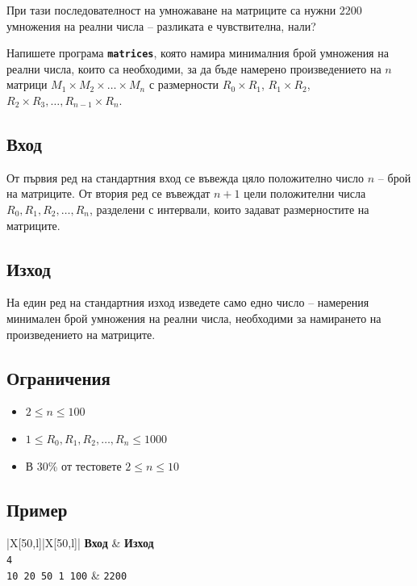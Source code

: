 \documentclass[12pt]{article}
\begin{document}
При тази последователност на умножаване на матриците са нужни $2200$ умножения на реални числа -- разликата е чувствителна, нали?

Напишете програма \textbf{\texttt{matrices}}, която намира минималния брой умножения на реални числа, които са необходими, за да бъде намерено произведението на $n$ матрици $M_1 \times M_2 \times \ldots \times M_n$ с размерности $R_0 \times R_1$, $R_1 \times R_2$, $R_2 \times R_3, \ldots, R_{n-1} \times R_n$.

\subsection{Вход}
От първия ред на стандартния вход се въвежда цяло положително число $n$ -- брой на матриците. От втория ред се въвеждат $n+1$ цели положителни числа $R_0, R_1, R_2, \ldots, R_n$, разделени с интервали, които задават размерностите на матриците.

\subsection{Изход}
На един ред на стандартния изход изведете само едно число -- намерения минимален брой умножения на реални числа, необходими за намирането на произведението на матриците.

\subsection{Ограничения}
\vspace{0.1em}
\begin{itemize}[label=$\clubsuit$]
	\item $2 \leq n \leq 100$
	\item $1 \leq R_0, R_1, R_2, \ldots, R_n \leq 1000$
	\item В 30\% от тестовете $2 \leq n \leq 10$
\end{itemize}

\subsection{Пример}
\begin{table}[!ht]
	\begin{tblr}{|X[50,l]|X[50,l]|}
		\hline
		\textbf{Вход} & \textbf{Изход} \\
		\hline
		\texttt{4 \\
			10 20 50 1 100}
		&
		\texttt{2200}
		\\
		\hline
	\end{tblr}
	\caption*{Примерът съответства на примера, разгледан в условието.}
\end{table}
\FloatBarrier
\end{document}
